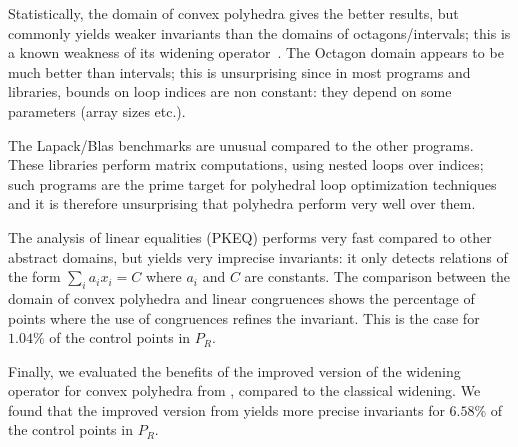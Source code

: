 \documentclass{entcs}
\begin{document}
Statistically, the domain of convex polyhedra gives the better results, but
commonly yields weaker invariants than the domains of octagons/intervals;
this is a known weakness of its widening operator~\cite{Monniaux_LeGuen2011}. 
The Octagon domain appears to be much better than intervals; this is
unsurprising since in most programs and libraries, bounds on loop indices are
non constant: they depend on some parameters (array sizes etc.).

The Lapack/Blas benchmarks are unusual compared to the other programs. These libraries perform matrix computations, using nested loops over indices; such programs are the prime target for polyhedral loop optimization techniques and it is therefore unsurprising that polyhedra perform very well over them.

The analysis of linear equalities (PKEQ) performs very fast compared
to other abstract domains, but yields very imprecise invariants:
it only detects relations of the form $\sum_i a_i x_i = C$ where $a_i$ and $C$ are constants.
The comparison between the domain of convex polyhedra and linear congruences
shows the percentage of points where the use of congruences refines the
invariant. This is the case for $1.04\%$ of the control points in $P_R$.

Finally, we evaluated the benefits of the improved version of the widening
operator for convex polyhedra from \citet{BagnaraHRZ05SCP}, compared to the
classical widening. We found that the improved version from
\citet{BagnaraHRZ05SCP} yields more precise invariants for $6.58\%$ of the
control points in $P_R$.

{\newcommand{\issn}[1]{{\footnotesize ISSN \href{http://www.worldcat.org/issn/#1}{#1}}}
\newcommand{\isbn}[1]{{\footnotesize ISBN \href{http://www.worldcat.org/isbn/#1}{#1}}}
\newcommand{\doix}[1]{\href{http://dx.doi.org/#1}{#1}\endgroup}
\newcommand{\doi}{\begingroup\footnotesize doi: \catcode`\_=13\def\_{\textunderscore}\doix}



}
\end{document}
